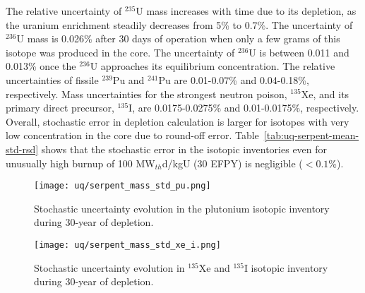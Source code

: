 The relative uncertainty of $^{235}$U mass increases with time due to its 
depletion, as the uranium enrichment steadily decreases from 5\% to 0.7\%.
The uncertainty of $^{236}$U mass is 
0.026\% after 30 days of operation when only a few grams of this isotope was 
produced in the core. The uncertainty of $^{236}$U is between 0.011  and 
0.013\% once the $^{236}$U approaches its equilibrium concentration. The 
relative uncertainties of fissile $^{239}$Pu and $^{241}$Pu are 0.01-0.07\% 
and 0.04-0.18\%, respectively. Mass uncertainties for the 
strongest neutron poison, $^{135}$Xe, and its primary direct precursor, 
$^{135}$I, are 0.0175-0.0275\% and 0.01-0.0175\%, respectively. Overall, 
stochastic error in depletion calculation is larger for isotopes with very low 
concentration in the core due to round-off error. 
Table~\ref{tab:uq-serpent-mean-std-rsd} shows that the stochastic error in the 
isotopic inventories even for unusually high burnup of 100 MW$_{th}$d/kgU (30 
\gls{EFPY}) is negligible ($<0.1$\%).

\begin{figure}[htp!] %
	\centering
	\texttt{[image: uq/serpent\_mass\_std\_pu.png]}
	\vspace{-3mm}
	\caption{Stochastic uncertainty evolution in the plutonium isotopic 
		inventory during 30-year of depletion.}
	\label{fig:uq-serpent-pu}
\end{figure}
	\vspace{-9mm}
\begin{figure}[hbp!] %
	\centering
	\texttt{[image: uq/serpent\_mass\_std\_xe\_i.png]}
		\vspace{-3mm}
	\caption{Stochastic uncertainty evolution in $^{135}$Xe and $^{135}$I 
	isotopic inventory during 30-year of depletion.}
	\label{fig:uq-serpent-xe-i}
\end{figure}


